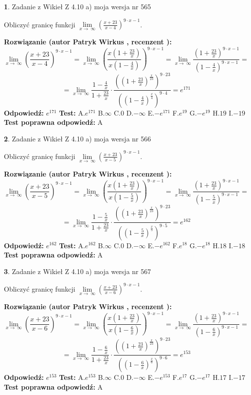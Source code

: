 \documentclass[12pt, a4paper]{article}
\theoremstyle{definition} %
\newtheorem{zad}{}
\newcommand{\zadStart}[1]{\begin{zad}#1\newline}
\newcommand{\zadStop}{\end{zad}}
\newcommand{\rozwStart}[2]{\noindent \textbf{Rozwiązanie (autor #1 , recenzent #2): }\newline}
\newcommand{\rozwStop}{\newline}
\newcommand{\odpStart}{\noindent \textbf{Odpowiedź:}\newline}
\newcommand{\odpStop}{\newline}
\newcommand{\testStart}{\noindent \textbf{Test:}\newline}
\newcommand{\testStop}{\newline}
\newcommand{\kluczStart}{\noindent \textbf{Test poprawna odpowiedź:}\newline}
\newcommand{\kluczStop}{\newline}
\begin{document}
\zadStart{Zadanie z Wikieł Z 4.10 a) moja wersja nr 565}

Obliczyć granicę funkcji  $\lim\limits_{x\to\ \infty}(\frac{x+23}{x-4})^{9\cdot x-1}$.
\zadStop
\rozwStart{Patryk Wirkus}{}
$$\lim\limits_{x\to\ \infty}(\frac{x+23}{x-4})^{9\cdot x-1} = \lim\limits_{x\to\ \infty}(\frac{x(1+\frac{23}{x})}{x(1-\frac{4}{x})})^{9\cdot x-1}=\lim\limits_{x\to\ \infty}\frac{(1+\frac{23}{x})^{9\cdot x-1}}{(1-\frac{4}{x})^{9\cdot x-1}}=$$
$$=\lim\limits_{x\to\ \infty}\frac{1-\frac{4}{x}}{1+\frac{23}{x}}\cdot\frac{((1+\frac{23}{x})^{\frac{x}{23}})^{9\cdot23}}{((1-\frac{4}{x})^{\frac{x}{4}})^{9\cdot4}}=e^{171}$$
\rozwStop
\odpStart
$e^{171}$
\odpStop
\testStart
A.$e^{171}$ B.$\infty$ C.$0$ D.$-\infty$ E.$-e^{171}$
F.$e^{19}$ G.$-e^{19}$
H.$19$
I.$-19$
\testStop
\kluczStart
A
\kluczStop



\zadStart{Zadanie z Wikieł Z 4.10 a) moja wersja nr 566}

Obliczyć granicę funkcji  $\lim\limits_{x\to\ \infty}(\frac{x+23}{x-5})^{9\cdot x-1}$.
\zadStop
\rozwStart{Patryk Wirkus}{}
$$\lim\limits_{x\to\ \infty}(\frac{x+23}{x-5})^{9\cdot x-1} = \lim\limits_{x\to\ \infty}(\frac{x(1+\frac{23}{x})}{x(1-\frac{5}{x})})^{9\cdot x-1}=\lim\limits_{x\to\ \infty}\frac{(1+\frac{23}{x})^{9\cdot x-1}}{(1-\frac{5}{x})^{9\cdot x-1}}=$$
$$=\lim\limits_{x\to\ \infty}\frac{1-\frac{5}{x}}{1+\frac{23}{x}}\cdot\frac{((1+\frac{23}{x})^{\frac{x}{23}})^{9\cdot23}}{((1-\frac{5}{x})^{\frac{x}{5}})^{9\cdot5}}=e^{162}$$
\rozwStop
\odpStart
$e^{162}$
\odpStop
\testStart
A.$e^{162}$ B.$\infty$ C.$0$ D.$-\infty$ E.$-e^{162}$
F.$e^{18}$ G.$-e^{18}$
H.$18$
I.$-18$
\testStop
\kluczStart
A
\kluczStop



\zadStart{Zadanie z Wikieł Z 4.10 a) moja wersja nr 567}

Obliczyć granicę funkcji  $\lim\limits_{x\to\ \infty}(\frac{x+23}{x-6})^{9\cdot x-1}$.
\zadStop
\rozwStart{Patryk Wirkus}{}
$$\lim\limits_{x\to\ \infty}(\frac{x+23}{x-6})^{9\cdot x-1} = \lim\limits_{x\to\ \infty}(\frac{x(1+\frac{23}{x})}{x(1-\frac{6}{x})})^{9\cdot x-1}=\lim\limits_{x\to\ \infty}\frac{(1+\frac{23}{x})^{9\cdot x-1}}{(1-\frac{6}{x})^{9\cdot x-1}}=$$
$$=\lim\limits_{x\to\ \infty}\frac{1-\frac{6}{x}}{1+\frac{23}{x}}\cdot\frac{((1+\frac{23}{x})^{\frac{x}{23}})^{9\cdot23}}{((1-\frac{6}{x})^{\frac{x}{6}})^{9\cdot6}}=e^{153}$$
\rozwStop
\odpStart
$e^{153}$
\odpStop
\testStart
A.$e^{153}$ B.$\infty$ C.$0$ D.$-\infty$ E.$-e^{153}$
F.$e^{17}$ G.$-e^{17}$
H.$17$
I.$-17$
\testStop
\kluczStart
A
\kluczStop
\end{document}
